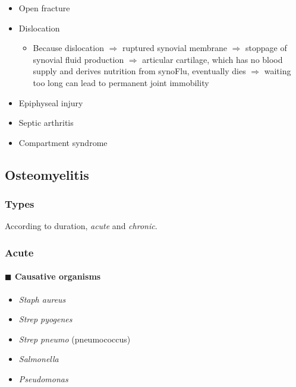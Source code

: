 \documentclass[
  14pt,
]{extarticle}
\providecommand{\tightlist}{%
  \setlength{\itemsep}{0pt}\setlength{\parskip}{0pt}}
\begin{document}
\begin{itemize}
\tightlist
\item
  Open fracture
\item
  Dislocation

  \begin{itemize}
  \tightlist
  \item
    Because dislocation \(\Rightarrow\) ruptured synovial membrane
    \(\Rightarrow\) stoppage of synovial fluid production
    \(\Rightarrow\) articular cartilage, which has no blood supply and
    derives nutrition from synoFlu, eventually dies \(\Rightarrow\)
    waiting too long can lead to permanent joint immobility
  \end{itemize}
\item
  Epiphyseal injury
\item
  Septic arthritis
\item
  Compartment syndrome
\end{itemize}

\pagebreak

\hypertarget{osteomyelitis}{%
\subsection{Osteomyelitis}\label{osteomyelitis}}

\hypertarget{types-2}{%
\subsubsection{Types}\label{types-2}}

According to duration, \emph{acute} and \emph{chronic}.

\hypertarget{acute}{%
\subsubsection{Acute}\label{acute}}

\hypertarget{blacksquare-causative-organisms}{%
\paragraph{\texorpdfstring{\(\blacksquare\) Causative
organisms}{\textbackslash blacksquare Causative organisms}}\label{blacksquare-causative-organisms}}

\begin{itemize}
\tightlist
\item
  \emph{Staph aureus}
\item
  \emph{Strep pyogenes}
\item
  \emph{Strep pneumo} (pneumococcus)
\item
  \emph{Salmonella}
\item
  \emph{Pseudomonas}
\end{itemize}
\end{document}
